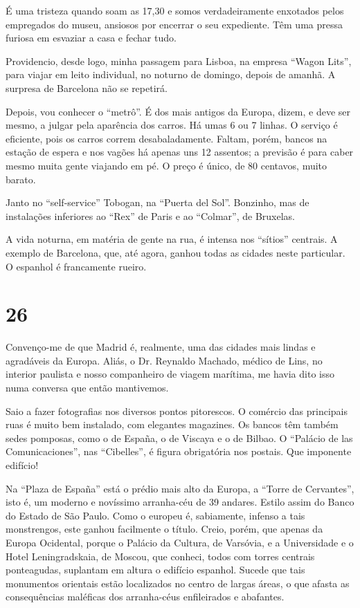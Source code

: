 É uma tristeza quando soam as 17,30 e somos verdadeiramente enxotados pelos empregados do museu, ansiosos por encerrar o seu expediente. Têm uma pressa furiosa em esvaziar a casa e fechar tudo.

Providencio, desde logo, minha passagem para Lisboa, na empresa “Wagon Lits”, para viajar em leito individual, no noturno de domingo, depois de amanhã. A surpresa de Barcelona não se repetirá.

Depois, vou conhecer o “metrô”. É dos mais antigos da Europa, dizem, e deve ser mesmo, a julgar pela aparência dos carros. Há umas 6 ou 7 linhas. O serviço é eficiente, pois os carros correm desabaladamente. Faltam, porém, bancos na estação de espera e nos vagões há apenas uns 12 assentos; a previsão é para caber mesmo muita gente viajando em pé. O preço é único, de 80 centavos, muito barato.

Janto no “self-service” Tobogan, na “Puerta del Sol”. Bonzinho, mas de instalações inferiores ao “Rex” de Paris e ao “Colmar”, de Bruxelas.

A vida noturna, em matéria de gente na rua, é intensa nos “sítios” centrais. A exemplo de Barcelona, que, até agora, ganhou todas as cidades neste particular. O espanhol é francamente rueiro.

\section*{26 \adfflatleafright {}}
Convenço-me de que Madrid é, realmente, uma das cidades mais lindas e agradáveis da Europa. Aliás, o Dr. Reynaldo Machado, médico de Lins, no interior paulista e nosso companheiro de viagem marítima, me havia dito isso numa conversa que então mantivemos.

Saio a fazer fotografias nos diversos pontos pitorescos. O comércio das principais ruas é muito bem instalado, com elegantes magazines. Os bancos têm também sedes pomposas, como o de España, o de Viscaya e o de Bilbao. O “Palácio de las Comunicaciones”, nas “Cibelles”, é figura obrigatória nos postais. Que imponente edifício!

Na “Plaza de España” está o prédio mais alto da Europa, a “Torre de Cervantes”, isto é, um moderno e novíssimo arranha-céu de 39 andares. Estilo assim do Banco do Estado de São Paulo. Como o europeu é, sabiamente, infenso a tais monstrengos, este ganhou facilmente o título. Creio, porém, que apenas da Europa Ocidental, porque o Palácio da Cultura, de Varsóvia, e a Universidade e o Hotel Leningradskaia, de Moscou, que conheci, todos com torres centrais ponteagudas, suplantam em altura o edifício espanhol. Sucede que tais monumentos orientais estão localizados no centro de largas áreas, o que afasta as consequências maléficas dos arranha-céus enfileirados e abafantes.

